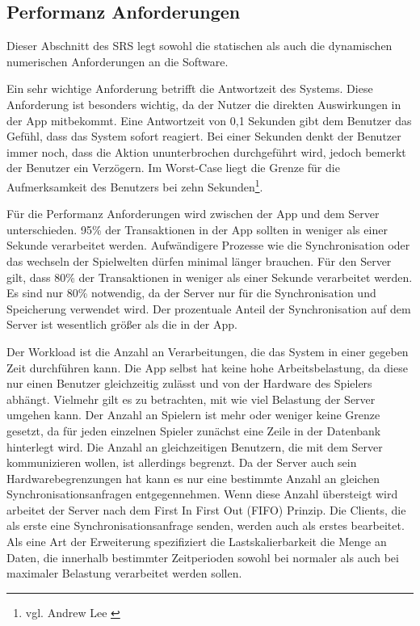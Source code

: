 	\subsection{Performanz Anforderungen}
		Dieser Abschnitt des SRS legt sowohl die statischen als auch die dynamischen numerischen Anforderungen an die Software. 
	
		Ein sehr wichtige Anforderung betrifft die Antwortzeit des Systems. Diese Anforderung ist besonders wichtig, da der Nutzer die direkten Auswirkungen in der App mitbekommt. Eine Antwortzeit von 0,1 Sekunden gibt dem Benutzer das Gefühl, dass das System sofort reagiert. Bei einer Sekunden denkt der Benutzer immer noch, dass die Aktion ununterbrochen durchgeführt wird, jedoch bemerkt der Benutzer ein Verzögern. Im Worst-Case liegt die Grenze für die Aufmerksamkeit des Benutzers bei zehn Sekunden\footnote{vgl. Andrew Lee \cite{performance1}}.
		
		Für die Performanz Anforderungen wird zwischen der App und dem Server unterschieden. 95\% der Transaktionen in der App sollten in weniger als einer Sekunde verarbeitet werden. Aufwändigere Prozesse wie die Synchronisation oder das wechseln der Spielwelten dürfen minimal länger brauchen. Für den Server gilt, dass 80\% der Transaktionen in weniger als einer Sekunde verarbeitet werden. Es sind nur 80\% notwendig, da der Server nur für die Synchronisation und Speicherung verwendet wird. Der prozentuale Anteil der Synchronisation auf dem Server ist wesentlich größer als die in der App. 
		
		Der Workload ist die Anzahl an Verarbeitungen, die das System in einer gegeben Zeit durchführen kann. Die App selbst hat keine hohe Arbeitsbelastung, da diese nur einen Benutzer gleichzeitig zulässt und von der Hardware des Spielers abhängt. Vielmehr gilt es zu betrachten, mit wie viel Belastung der Server umgehen kann. Der Anzahl an Spielern ist mehr oder weniger keine Grenze gesetzt, da für jeden einzelnen Spieler zunächst eine Zeile in der Datenbank hinterlegt wird. Die Anzahl an gleichzeitigen Benutzern, die mit dem Server kommunizieren wollen, ist allerdings begrenzt. Da der Server auch sein Hardwarebegrenzungen hat kann es nur eine bestimmte Anzahl an gleichen Synchronisationsanfragen entgegennehmen. Wenn diese Anzahl übersteigt wird arbeitet der Server nach dem First In First Out (FIFO) Prinzip. Die Clients, die als erste eine Synchronisationsanfrage senden, werden auch als erstes bearbeitet. Als eine Art der Erweiterung spezifiziert die Lastskalierbarkeit die Menge an Daten, die innerhalb bestimmter Zeitperioden sowohl bei normaler als auch bei maximaler Belastung verarbeitet werden sollen.

